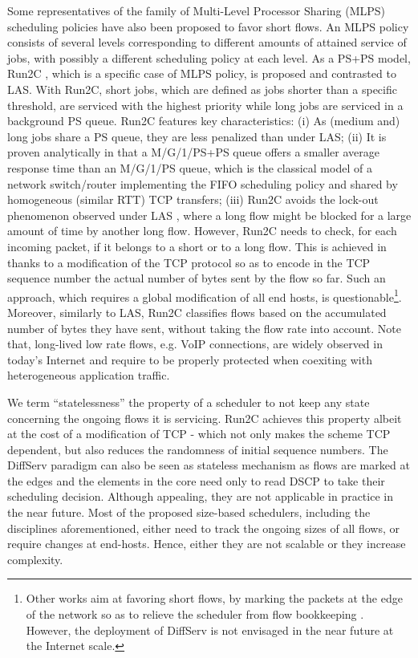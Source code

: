 \documentclass[preprint,12pt]{elsarticle}
\begin{document}
Some representatives of the family of Multi-Level Processor Sharing (MLPS) scheduling policies \cite{kleinrock_76_queueing} have also been proposed to favor short flows. An MLPS policy consists of several levels corresponding to different amounts of attained service of jobs, with possibly a different scheduling policy at each level. As a PS+PS model, Run2C \cite{Avrachenkov04Run2c}, which is a specific case of MLPS policy, is proposed and contrasted to LAS. With Run2C, short jobs, which are defined as jobs shorter than a specific threshold, are serviced with the highest priority while long jobs are serviced in a background PS queue. Run2C features key characteristics: (i) As (medium and) long jobs share a PS queue, they are less penalized than under LAS; (ii) It is proven analytically in \cite{Avrachenkov04Run2c} that a M/G/1/PS+PS queue offers a smaller average response time than an M/G/1/PS queue, which is the classical model of a network switch/router implementing the FIFO scheduling policy and shared by homogeneous (similar RTT) TCP transfers; (iii) Run2C avoids the lock-out phenomenon observed under LAS \cite{Martin10Lars}, where a long flow might be blocked for a large amount of time by another long flow. However, Run2C needs to check, for each incoming packet, if it belongs to a short or to a long flow. This is achieved in \cite{Avrachenkov04Run2c} thanks to a modification of the TCP protocol so as to encode in the TCP sequence number the actual number of bytes sent by the flow so far. Such an approach, which requires a global modification of all end hosts, is questionable\footnote{Other works aim at favoring short flows, by marking the packets at the edge of the network so as to relieve the scheduler from flow bookkeeping \cite{Noureddine02improvingthe}. However, the deployment of DiffServ is not envisaged in the near future at the Internet scale.}. Moreover, similarly to LAS, Run2C classifies flows based on the accumulated number of bytes they have sent, without taking the flow rate into account. Note that, long-lived low rate flows, e.g. VoIP connections, are widely observed in today's Internet and require to be properly protected when coexiting with heterogeneous application traffic. 

We term ``statelessness'' the property of a scheduler to not keep any state concerning the ongoing flows it is servicing. Run2C achieves this property albeit at the cost of a modification of TCP -  which not only makes the scheme TCP dependent, but also reduces the randomness of initial sequence numbers. The DiffServ\cite{Noureddine02improvingthe} paradigm can also be seen as stateless mechanism as flows are marked at the edges and the elements in the core need only to read DSCP to take their scheduling decision. Although appealing, they are not applicable in practice in the near future. Most of the proposed size-based schedulers, including the disciplines aforementioned, either need to track the ongoing sizes of all flows, or require changes at end-hosts. Hence, either they are not scalable or they increase complexity. 
\end{document}
